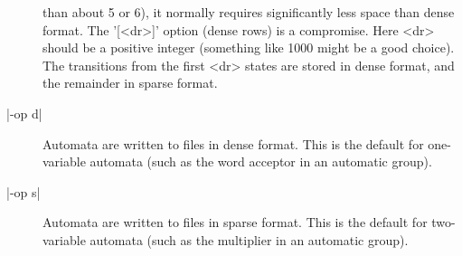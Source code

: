 \begin{description}
than about 5 or 6), it normally requires significantly less space than
dense format. The '[<dr>]' option (dense rows) is a compromise.
Here <dr> should be a positive integer (something like 1000 might be a good
choice). The transitions from the first <dr> states are stored in dense
format, and the remainder in sparse format.
\item[|-op d|]
Automata are written to files in dense format. This is the default
for one-variable automata (such as the word acceptor in an automatic
group).
\item[|-op s|]
Automata are written to files in sparse format. This is the default
for two-variable automata (such as the multiplier in an automatic
group).
\end{description}

